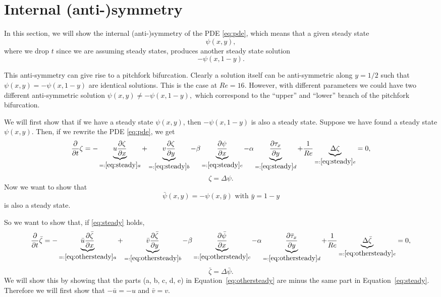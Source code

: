 \section{Internal (anti-)symmetry}

In this section, we will show the internal (anti-)symmetry of the PDE \eqref{eq:pde}, which means that a given steady state $$\psi(x, y),$$ where we drop $t$ since we are assuming steady states, produces another steady state solution $$-\psi(x, 1 - y).$$

This anti-symmetry can give rise to a pitchfork bifurcation. Clearly a solution itself can be anti-symmetric along $y = 1/2$ such that $\psi(x,y)=-\psi(x,1 - y)$ are identical solutions. This is the case at $Re=16.$ However, with different parameters we could have two different anti-symmetric solution $\psi(x,y) \neq -\psi(x,1 - y),$ which correspond to the ``upper'' and ``lower'' branch of the pitchfork bifurcation.

We will first show that if we have a steady state $\psi(x,y)$, then $-\psi(x,1-y)$ is also a steady state. Suppose we have found a steady state $\psi(x,y)$. Then, if we rewrite the PDE \ref{eq:pde}, we get
 \begin{equation}
   \frac{\partial}{\partial t}\zeta= - \underbrace{   u \frac{\partial\zeta}{\partial x}}_{=:\ref{eq:steady} a} +\underbrace{  v \frac{\partial\zeta}{\partial y}}_{=:\ref{eq:steady}b} - \beta \underbrace{\frac{\partial \psi}{\partial x} }_{=:\ref{eq:steady}c} - \alpha\underbrace{ \frac{\partial \tau_x}{\partial y}}_{=:\ref{eq:steady} d} +\frac{1}{Re}  \underbrace{\Delta \zeta}_{=:\ref{eq:steady}e}=0\label{eq:steady},
\end{equation}
 $$\zeta=\Delta \psi .$$
Now we want to show that 
$$\bar{\psi}(x,y)=-\psi(x,\bar{y}) \text{ with }\bar{y}=1-y$$
is also a steady state.

So we want to show that, if \eqref{eq:steady} holds, 
 \begin{equation} \frac{\partial}{\partial t}\bar{\zeta}=- \underbrace{  \bar u \frac{\partial\bar{\zeta}}{\partial x}}_{=:\ref{eq:othersteady} a} +\underbrace{ \bar v \frac{\partial\bar{\zeta}}{\partial y}}_{=:\ref{eq:othersteady}b} -\beta \underbrace{ \frac{\partial \bar{\psi}}{\partial x} }_{=:\ref{eq:othersteady}c} -\alpha  \underbrace{\frac{\partial \bar \tau_x}{\partial y}}_{=:\ref{eq:othersteady}d} + \frac{1}{Re} \underbrace{\Delta \bar{\zeta}}_{=:\ref{eq:othersteady}e}=0, \label{eq:othersteady}
 \end{equation}
 $$\bar{\zeta}=\Delta \bar{\psi}.$$ 
We will show this by showing that the parts (a, b, c, d, e) in Equation~\eqref{eq:othersteady} are minus the same part in Equation~\eqref{eq:steady}. Therefore we will first show that $-\bar{u}=-u$ and $\bar{v}=v$. 
 
